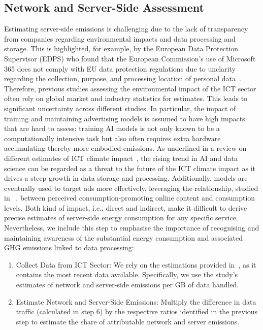 \documentclass[sigconf,9pt,usenames,dvipsnames,table]{acmart}
\begin{document}
\subsection{Network and Server-Side Assessment} \label{network-server}


Estimating server-side emissions is challenging due to the lack of
transparency from companies regarding environmental impacts and data
processing and storage. This is highlighted, for example, by the European Data
Protection Supervisor (EDPS) who found that the European Commission’s use
of Microsoft 365 does not comply with EU data protection regulations due to
unclarity regarding the collection, purpose, and processing location of
personal data~\cite{EuropeanCommissionsUse2024}.
Therefore, previous studies assessing the environmental impact of the ICT sector~\cite{malmodin2024ict,freitag_real_2021} often rely on global market and industry statistics for estimates. This leads to significant uncertainty across
different studies. In particular, the impact of training and maintaining advertising models is assumed to have
high impacts that are hard to assess: training AI models is not only known to be a computationally intensive task but also often requires extra hardware accumulating thereby more embodied emissions. As underlined in a review on different estimates of ICT climate impact~\cite{freitag_real_2021}, the rising trend in AI and data science can be regarded as a threat to the future of the ICT climate impact as it drives a steep growth in data storage and processing. Additionally, models are eventually used to target ads more effectively, leveraging the relationship, studied in ~\cite{frick_online_2021}, between perceived consumption-promoting online content and consumption levels. Both kind of impact, i.e., direct and indirect, make it difficult to derive precise estimates of server-side energy consumption for any specific service.
Nevertheless, we include this step to emphasise the importance of
recognising and maintaining awareness of the substantial energy consumption
and associated GHG emissions linked to data processing:

\begin{enumerate}
  \item Collect Data from ICT Sector: We rely on the estimations provided
        in~\cite{malmodin2024ict}, as it contains the most recent data available.
        Specifically, we use the study’s estimates of network and server-side
        emissions per GB of data handled.
  \item Estimate Network and Server-Side Emissions: Multiply the difference
        in data traffic (calculated in step 6) by the respective ratios identified
        in the previous step to estimate the share of attributable network and server emissions.
\end{enumerate}
\end{document}

